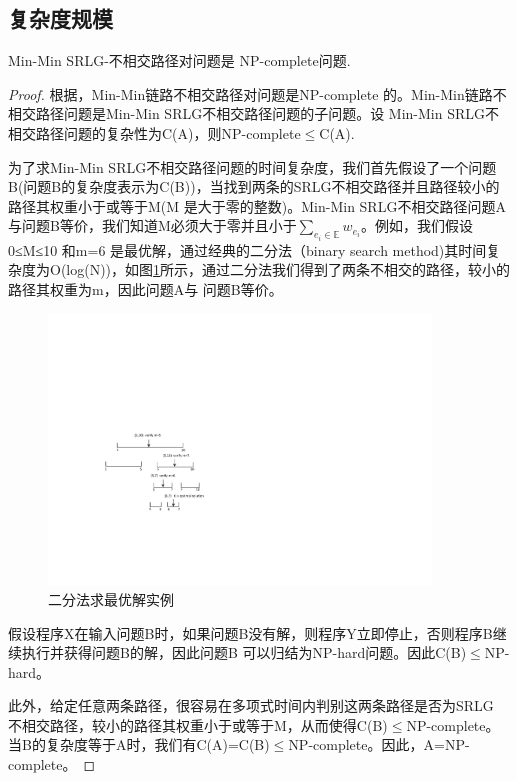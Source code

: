 \subsection{复杂度规模}
\begin{theorem}
\label{le:lemma1}
    Min-Min SRLG-不相交路径对问题是 NP-complete问题.
\end{theorem}
\begin{proof}
根据\cite{bhatia2006finding}，Min-Min链路不相交路径对问题是NP-complete 的。Min-Min链路不相交路径问题是Min-Min SRLG不相交路径问题的子问题。设
Min-Min SRLG不相交路径问题的复杂性为C(A)，则NP-complete$\leq$C(A).

为了求Min-Min SRLG不相交路径问题的时间复杂度，我们首先假设了一个问题B(问题B的复杂度表示为C(B))，当找到两条的SRLG不相交路径并且路径较小的路径其权重小于或等于M(M 是大于零的整数)。Min-Min SRLG不相交路径问题A 与问题B等价，我们知道M必须大于零并且小于$\sum\limits_{e_i\in \mathbb{E}}w_{e_i}$。例如，我们假设0≤M≤10 和m=6 是最优解，通过经典的二分法（binary search method)其时间复杂度为O(log(N))，如图\ref{fig:binarySearch}所示，通过二分法我们得到了两条不相交的路径，较小的路径其权重为m，因此问题A与 问题B等价。
\begin{figure}[htbp]
  \centering
  \includegraphics[width=4.0in]{figures/binarySearch}
  \caption{二分法求最优解实例}
  \label{fig:binarySearch}
\end{figure}
假设程序X在输入问题B时，如果问题B没有解，则程序Y立即停止，否则程序B继续执行并获得问题B的解，因此问题B 可以归结为NP-hard问题。因此C(B)$\leq$NP-hard。

此外，给定任意两条路径，很容易在多项式时间内判别这两条路径是否为SRLG 不相交路径，较小的路径其权重小于或等于M，从而使得C(B)$\leq$NP-complete。 当B的复杂度等于A时，我们有C(A)=C(B)$\leq$NP-complete。因此，A=NP-complete。
\end{proof}

